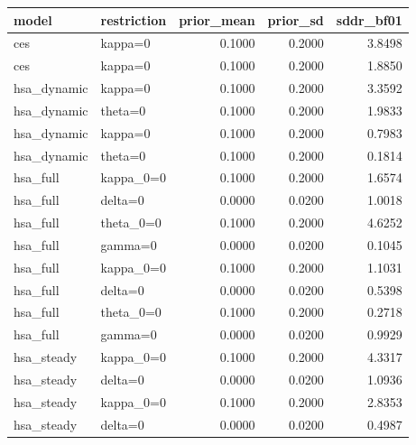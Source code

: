 \begin{tabular}{llrrr}
\toprule
model & restriction & prior\_mean & prior\_sd & sddr\_bf01 \\
\midrule
ces & kappa=0 & 0.1000 & 0.2000 & 3.8498 \\
ces & kappa=0 & 0.1000 & 0.2000 & 1.8850 \\
hsa\_dynamic & kappa=0 & 0.1000 & 0.2000 & 3.3592 \\
hsa\_dynamic & theta=0 & 0.1000 & 0.2000 & 1.9833 \\
hsa\_dynamic & kappa=0 & 0.1000 & 0.2000 & 0.7983 \\
hsa\_dynamic & theta=0 & 0.1000 & 0.2000 & 0.1814 \\
hsa\_full & kappa\_0=0 & 0.1000 & 0.2000 & 1.6574 \\
hsa\_full & delta=0 & 0.0000 & 0.0200 & 1.0018 \\
hsa\_full & theta\_0=0 & 0.1000 & 0.2000 & 4.6252 \\
hsa\_full & gamma=0 & 0.0000 & 0.0200 & 0.1045 \\
hsa\_full & kappa\_0=0 & 0.1000 & 0.2000 & 1.1031 \\
hsa\_full & delta=0 & 0.0000 & 0.0200 & 0.5398 \\
hsa\_full & theta\_0=0 & 0.1000 & 0.2000 & 0.2718 \\
hsa\_full & gamma=0 & 0.0000 & 0.0200 & 0.9929 \\
hsa\_steady & kappa\_0=0 & 0.1000 & 0.2000 & 4.3317 \\
hsa\_steady & delta=0 & 0.0000 & 0.0200 & 1.0936 \\
hsa\_steady & kappa\_0=0 & 0.1000 & 0.2000 & 2.8353 \\
hsa\_steady & delta=0 & 0.0000 & 0.0200 & 0.4987 \\
\bottomrule
\end{tabular}
